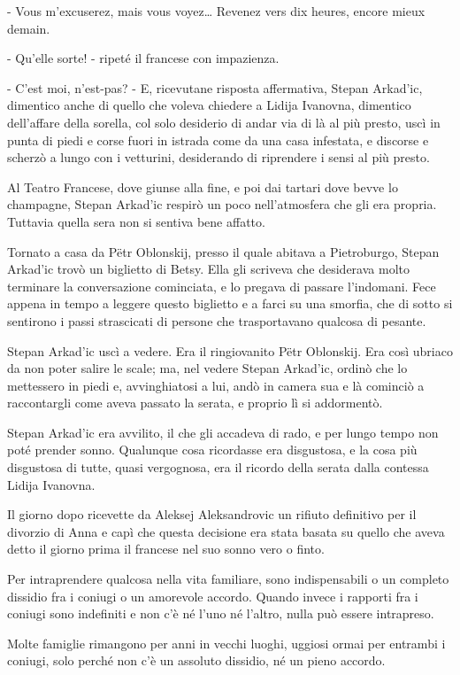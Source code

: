 - Vous m'excuserez, mais vous voyez\ldots{} Revenez vers dix heures, encore mieux demain. 

- Qu'elle sorte! - ripeté il francese con impazienza. 

- C'est moi, n'est-pas? - E, ricevutane risposta affermativa, Stepan Arkad'ic, dimentico anche di quello che voleva chiedere a Lidija Ivanovna, dimentico dell'affare della sorella, col solo desiderio di andar via di là al più presto, uscì in punta di piedi e corse fuori in istrada come da una casa infestata, e discorse e scherzò a lungo con i vetturini, desiderando di riprendere i sensi al più presto. 

Al Teatro Francese, dove giunse alla fine, e poi dai tartari dove bevve lo champagne, Stepan Arkad'ic respirò un poco nell'atmosfera che gli era propria. Tuttavia quella sera non si sentiva bene affatto. 

Tornato a casa da Pëtr Oblonskij, presso il quale abitava a Pietroburgo, Stepan Arkad'ic trovò un biglietto di Betsy. Ella gli scriveva che desiderava molto terminare la conversazione cominciata, e lo pregava di passare l'indomani. Fece appena in tempo a leggere questo biglietto e a farci su una smorfia, che di sotto si sentirono i passi strascicati di persone che trasportavano qualcosa di pesante. 

Stepan Arkad'ic uscì a vedere. Era il ringiovanito Pëtr Oblonskij. Era così ubriaco da non poter salire le scale; ma, nel vedere Stepan Arkad'ic, ordinò che lo mettessero in piedi e, avvinghiatosi a lui, andò in camera sua e là cominciò a raccontargli come aveva passato la serata, e proprio lì si addormentò. 

Stepan Arkad'ic era avvilito, il che gli accadeva di rado, e per lungo tempo non poté prender sonno. Qualunque cosa ricordasse era disgustosa, e la cosa più disgustosa di tutte, quasi vergognosa, era il ricordo della serata dalla contessa Lidija Ivanovna. 

Il giorno dopo ricevette da Aleksej Aleksandrovic un rifiuto definitivo per il divorzio di Anna e capì che questa decisione era stata basata su quello che aveva detto il giorno prima il francese nel suo sonno vero o finto. 

Per intraprendere qualcosa nella vita familiare, sono indispensabili o un completo dissidio fra i coniugi o un amorevole accordo. Quando invece i rapporti fra i coniugi sono indefiniti e non c'è né l'uno né l'altro, nulla può essere intrapreso. 

Molte famiglie rimangono per anni in vecchi luoghi, uggiosi ormai per entrambi i coniugi, solo perché non c'è un assoluto dissidio, né un pieno accordo. 

